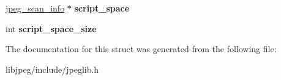 \begin{DoxyCompactItemize}
\item 
\hypertarget{structjpeg__compress__struct_a0158c151082693a72a46841ada4be08d}{\hyperlink{structjpeg__scan__info}{jpeg\-\_\-scan\-\_\-info} $\ast$ {\bfseries script\-\_\-space}}\label{structjpeg__compress__struct_a0158c151082693a72a46841ada4be08d}

\item 
\hypertarget{structjpeg__compress__struct_ae50a683b4baddef6571900ca6240b1a3}{int {\bfseries script\-\_\-space\-\_\-size}}\label{structjpeg__compress__struct_ae50a683b4baddef6571900ca6240b1a3}

\end{DoxyCompactItemize}


The documentation for this struct was generated from the following file\-:\begin{DoxyCompactItemize}
\item 
libjpeg/include/jpeglib.\-h\end{DoxyCompactItemize}
